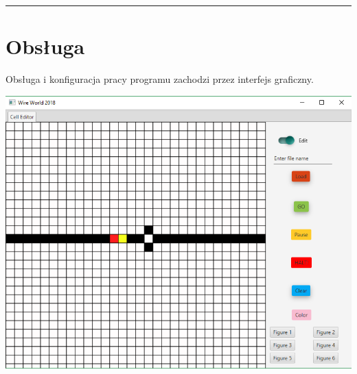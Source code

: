 \documentclass[a4paper,11pt]{article}
\newcommand{\linia}{\rule{\linewidth}{0.4mm}}
\begin{document}
\noindent\linia
\section{Obsługa}
Obsługa i konfiguracja pracy programu zachodzi przez interfejs graficzny.


\includegraphics[width=\textwidth]{GUI_WireWorld}
\end{document}
